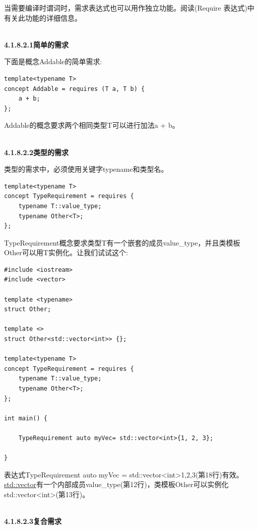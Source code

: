 当需要编译时谓词时，需求表达式也可以用作独立功能。阅读(Require 表达式)中有关此功能的详细信息。

\hspace*{\fill} \\ %
\noindent
\textbf{4.1.8.2.1\hspace{0.2cm}简单的需求}

下面是概念Addable的简单需求:

\begin{lstlisting}[style=styleCXX]
template<typename T>
concept Addable = requires (T a, T b) {
	a + b;
};
\end{lstlisting}

Addable的概念要求两个相同类型T可以进行加法a + b。

\hspace*{\fill} \\ %
\noindent
\textbf{4.1.8.2.2\hspace{0.2cm}类型的需求}

类型的需求中，必须使用关键字typename和类型名。

\begin{lstlisting}[style=styleCXX]
template<typename T>
concept TypeRequirement = requires {
	typename T::value_type;
	typename Other<T>;
};
\end{lstlisting}

TypeRequirement概念要求类型T有一个嵌套的成员value\_type，并且类模板Other可以用T实例化。让我们试试这个:

\begin{lstlisting}[style=styleCXX]
#include <iostream>
#include <vector>

template <typename>
struct Other;

template <>
struct Other<std::vector<int>> {};

template<typename T>
concept TypeRequirement = requires {
	typename T::value_type;
	typename Other<T>;
};

int main() {

	TypeRequirement auto myVec= std::vector<int>{1, 2, 3};

}
\end{lstlisting}

表达式TypeRequirement auto myVec = std::vector<int>{1,2,3}(第18行)有效。\href{https://en.cppreference.com/w/cpp/container/vector}{std::vector}有一个内部成员value\_type(第12行)，类模板Other可以实例化std::vector<int>(第13行)。

\hspace*{\fill} \\ %
\noindent
\textbf{4.1.8.2.3\hspace{0.2cm}复合需求}

